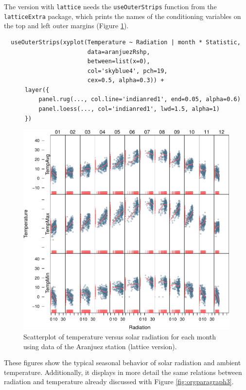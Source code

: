 \documentclass[smallroyalvopaper]{memoir}
\begin{document}
The version with \texttt{lattice} needs the \texttt{useOuterStrips} function from
the \texttt{latticeExtra} package, which prints the names of the conditioning
variables on the top and left outer margins (Figure
\ref{fig:orgparagraph5}).


\lstset{language=R,label= ,caption= ,captionpos=b,numbers=none}
\begin{lstlisting}
  useOuterStrips(xyplot(Temperature ~ Radiation | month * Statistic,
                        data=aranjuezRshp,
                        between=list(x=0),
                        col='skyblue4', pch=19,
                        cex=0.5, alpha=0.3)) +
      layer({
          panel.rug(..., col.line='indianred1', end=0.05, alpha=0.6)
          panel.loess(..., col='indianred1', lwd=1.5, alpha=1)
      })
\end{lstlisting}

\begin{figure}[htb]
\centering
\includegraphics[width=.9\linewidth]{figs/aranjuezOuterStrips.pdf}
\caption{\label{fig:orgparagraph5}
Scatterplot of temperature versus solar radiation for each month using data of the Aranjuez station (lattice version).}
\end{figure}

These figures show the typical seasonal behavior of solar radiation
and ambient temperature. Additionally, it displays in more detail the
same relations between radiation and temperature already discussed
with Figure \ref{fig:orgparagraph3}.
\end{document}
